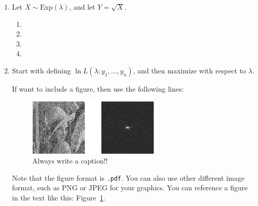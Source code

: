 \documentclass[11pt]{article}
\begin{document}
\begin{enumerate}
\begin{enumerate}
\end{enumerate}

\item Let $X \sim \mathrm{Exp}(\lambda)$, and let $Y = \sqrt{X}$.
\begin{enumerate}
\item %

\item %

\item %

\item %
\end{enumerate}

\item Start with defining $\ln L(\lambda ; y_1, \ldots, y_n)$, and then maximize
with respect to $\lambda$.

If want to include a figure, then use the following lines:
\begin{figure}[h!]
\begin{center}
\includegraphics[width=0.6\textwidth]{fft_noise}
\caption{Always write a caption!!}
\label{fig:fouriertransform}
\end{center}
\end{figure}

Note that the figure format is {\tt .pdf}. You can also use other different image format, such as PNG or JPEG
for your graphics. You can reference a figure in the text like this: Figure~\ref{fig:fouriertransform}.

\end{enumerate}
\end{document}
